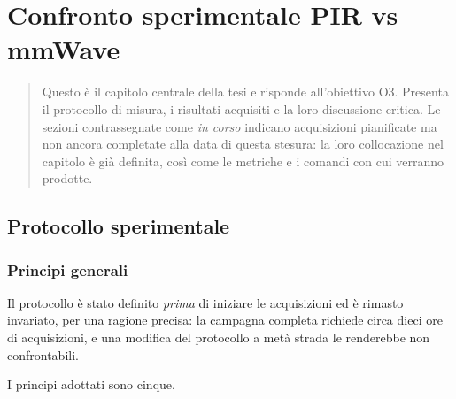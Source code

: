 \chapter{Confronto sperimentale PIR vs mmWave}
\label{cap:confronto}

\begin{quote}\small
Questo è il capitolo centrale della tesi e risponde all'obiettivo O3. Presenta il
protocollo di misura, i risultati acquisiti e la loro discussione critica. Le
sezioni contrassegnate come \emph{in corso} indicano acquisizioni pianificate ma
non ancora completate alla data di questa stesura: la loro collocazione nel
capitolo è già definita, così come le metriche e i comandi con cui verranno
prodotte.
\end{quote}

\section{Protocollo sperimentale}
\label{sec:protocollo}

\subsection{Principi generali}

Il protocollo è stato definito \emph{prima} di iniziare le acquisizioni ed è
rimasto invariato, per una ragione precisa: la campagna completa richiede circa
dieci ore di acquisizioni, e una modifica del protocollo a metà strada le renderebbe
non confrontabili.

I principi adottati sono cinque.

